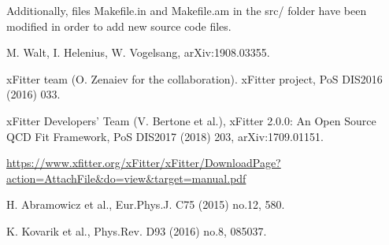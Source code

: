 \documentclass{article}
\begin{document}
\noindent Additionally, files Makefile.in and Makefile.am in the src/ folder have been modified in order to add new source code files.


\begin{thebibliography}{99}

 M. Walt, I. Helenius, W. Vogelsang, arXiv:1908.03355.

 xFitter team (O. Zenaiev for the collaboration). xFitter project, PoS DIS2016 (2016) 033.

 xFitter Developers' Team (V. Bertone et al.), xFitter 2.0.0: An Open Source QCD Fit Framework, PoS DIS2017 (2018) 203, arXiv:1709.01151.

 \url{https://www.xfitter.org/xFitter/xFitter/DownloadPage?action=AttachFile&do=view&target=manual.pdf}

 H. Abramowicz et al., Eur.Phys.J. C75 (2015) no.12, 580.

 K. Kovarik et al., Phys.Rev. D93 (2016) no.8, 085037.


\end{thebibliography}
\end{document}

